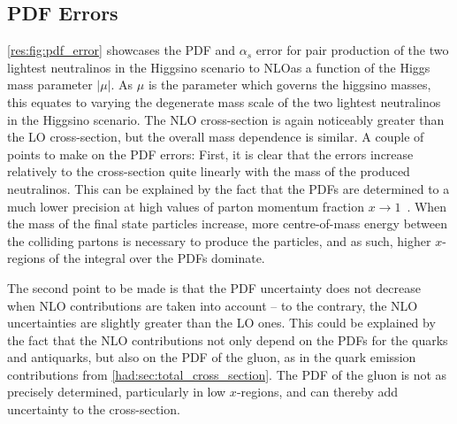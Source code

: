 \documentclass[../main.tex]{subfiles}
\begin{document}
\subsection{PDF Errors}
\cref{res:fig:pdf_error} showcases the PDF and \(\alpha_s\) error for pair production of the two lightest neutralinos in the Higgsino scenario to NLO\@ as a function of the Higgs mass parameter \(|\mu|\).
As \(\mu\) is the parameter which governs the higgsino masses, this equates to varying the degenerate mass scale of the two lightest neutralinos in the Higgsino scenario.
The NLO cross-section is again noticeably greater than the LO cross-section, but the overall mass dependence is similar.
A couple of points to make on the PDF errors:
First, it is clear that the errors increase relatively to the cross-section quite linearly with the mass of the produced neutralinos.
This can be explained by the fact that the PDFs are determined to a much lower precision at high values of parton momentum fraction \(x \to 1\)~\cite{PDF4LHCWorkingGroup:2022cjn}.
When the mass of the final state particles increase, more centre-of-mass energy between the colliding partons is necessary to produce the particles, and as such, higher \(x\)-regions of the integral over the PDFs dominate.

The second point to be made is that the PDF uncertainty does not decrease when NLO contributions are taken into account -- to the contrary, the NLO uncertainties are slightly greater than the LO ones.
This could be explained by the fact that the NLO contributions not only depend on the PDFs for the quarks and antiquarks, but also on the PDF of the gluon, as in the quark emission contributions from \cref{had:sec:total_cross_section}.
The PDF of the gluon is not as precisely determined, particularly in low \(x\)-regions, and can thereby add uncertainty to the cross-section.
\end{document}

